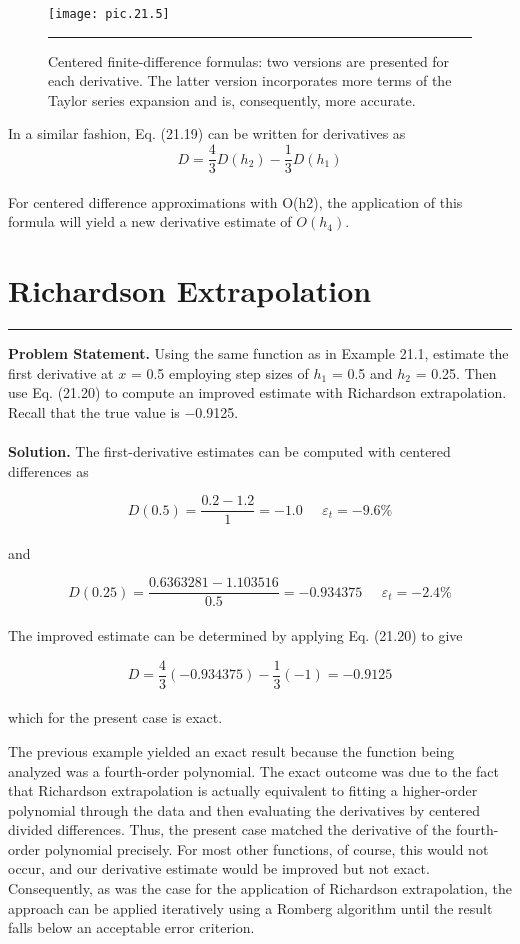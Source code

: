 \documentclass[../main.tex]{subfiles}
\begin{document}
\begin{figure}[hbt!]
	\centering
	\texttt{[image: pic.21.5]}
	\caption{\textsf{Centered finite-difference formulas: two versions are presented for each derivative. The latter
version incorporates more terms of the Taylor series expansion and is, consequently, more
accurate.
}} \hrule
	\label{pic.21.5}
\end{figure}
In a similar fashion, Eq. (21.19) can be written for derivatives as
\begin{equation}
	\tag{21.20}
	D= \dfrac{4}{3}D(h_{2}) - \dfrac{1}{3}D(h_{1})
\end{equation}\\
For centered difference approximations with O(h2), the application of this formula will
yield a new derivative estimate of $O(h_{4})$.

\vspace{0,6in}
\section{Richardson Extrapolation}
\vspace{0,1in}
\hrule
\vspace{0,1in}
\textbf{Problem Statement.} Using the same function as in Example 21.1, estimate the first derivative at $x$ = 0.5 employing step sizes of $h_{1}$ = 0.5 and $h_{2}$ = 0.25. Then use Eq. (21.20)
to compute an improved estimate with Richardson extrapolation. Recall that the true value
is −0.9125.\\
\vspace{0.2in}\\
\textbf{Solution.} The first-derivative estimates can be computed with centered differences as

	$$D(0.5) = \dfrac{0.2 - 1.2}{1} = - 1.0 \; \; \; \; \; \varepsilon_{t} = -9.6\%$$\\
and

	$$D(0.25) = \dfrac{0.6363281 - 1.103516}{0.5} = -0.934375 \; \; \; \; \; \varepsilon_{t} = -2.4\%$$\\
The improved estimate can be determined by applying Eq. (21.20) to give

	$$D = \dfrac{4}{3}(-0.934375) -\dfrac{1}{3}(-1) = -0.9125$$\\
which for the present case is exact.
\vspace{0.2in}

The previous example yielded an exact result because the function being analyzed was
a fourth-order polynomial. The exact outcome was due to the fact that Richardson extrapolation is actually equivalent to fitting a higher-order polynomial through the data and then
evaluating the derivatives by centered divided differences. Thus, the present case matched
the derivative of the fourth-order polynomial precisely. For most other functions, of course,
this would not occur, and our derivative estimate would be improved but not exact. Consequently, as was the case for the application of Richardson extrapolation, the approach can
be applied iteratively using a Romberg algorithm until the result falls below an acceptable
error criterion. 
\end{document}
